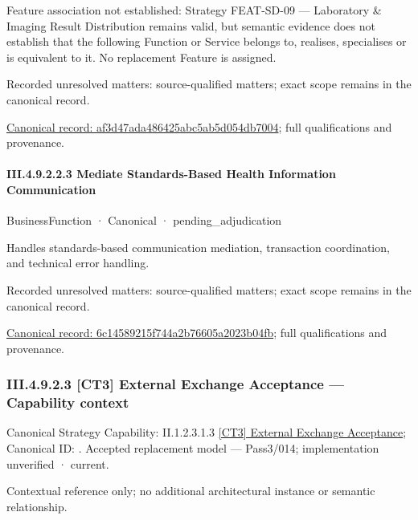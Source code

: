 Feature association not established: Strategy FEAT-SD-09 — Laboratory \& Imaging Result Distribution remains valid, but semantic evidence does not establish that the following Function or Service belongs to, realises, specialises or is equivalent to it. No replacement Feature is assigned.


{\small Recorded unresolved matters: source-qualified matters; exact scope remains in the canonical record.}\par
{\footnotesize \href{../../../../../../../continuum/business/business-function/af3d47ada486425abc5ab5d054db7004.md}{Canonical record: af3d47ada486425abc5ab5d054db7004}; full qualifications and provenance.}\par
\paragraph*{III.4.9.2.2.3 Mediate Standards-Based Health Information Communication}
\label{navigation:III.4.9.2.2.3}

\label{element:6c14589215f744a2b76605a2023b04fb}
{\small BusinessFunction · Canonical · pending\_adjudication}\par

Handles standards-based communication mediation, transaction coordination, and technical error handling.


{\small Recorded unresolved matters: source-qualified matters; exact scope remains in the canonical record.}\par
{\footnotesize \href{../../../../../../../continuum/business/business-function/6c14589215f744a2b76605a2023b04fb.md}{Canonical record: 6c14589215f744a2b76605a2023b04fb}; full qualifications and provenance.}\par
\subsubsection*{III.4.9.2.3 [CT3] External Exchange Acceptance — Capability context}
\label{navigation:III.4.9.2.3}

{\small Canonical Strategy Capability: II.1.2.3.1.3 \hyperref[element:ff8ab280fa034c10b846a147ab7dbfb3]{[CT3] External Exchange Acceptance}; Canonical ID: \texttt{}. Accepted replacement model — Pass3/014; implementation unverified · current.}\par
Contextual reference only; no additional architectural instance or semantic relationship.\par
